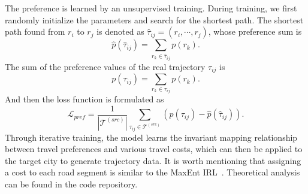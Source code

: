 The preference is learned by an unsupervised training. During training, we first randomly initialize the parameters and search for the shortest path. The shortest path found from $r_i$ to $r_j$ is denoted as $\hat{\tau}_{ij} = (r_i, \cdots, r_j)$, whose preference sum is 
\begin{equation}
    \hat{p} \left( \hat{\tau}_{ij} \right) = \sum_{r_k \in \hat{\tau}_{ij}} p(r_k).
\end{equation}
The sum of the preference values of the real trajectory ${\tau}_{ij}$ is
\begin{equation}
    p \left( \tau_{ij} \right) = \sum_{r_k \in \tau_{ij}} p(r_k).
\end{equation}
And then the loss function is formulated as 
\begin{equation}
    \mathcal{L}_{pref} = \frac{1}{\left| \mathcal{T}^{(src)} \right|} \sum_{\tau_{ij} \in \mathcal{T}^{(src)}} \left( p \left( \tau_{ij} \right) - \hat{p} \left( \hat{\tau}_{ij} \right)\right).
\end{equation}
Through iterative training, the model learns the invariant mapping relationship between travel preferences and various travel costs, which can then be applied to the target city to generate trajectory data. It is worth mentioning that assigning a cost to each road segment is similar to the MaxEnt IRL~\cite{max_ent}. Theoretical analysis can be found in the code repository.
